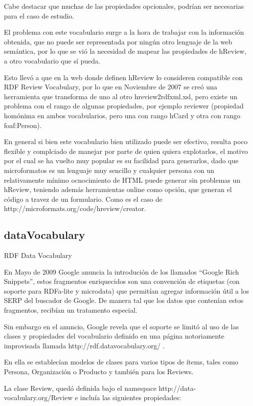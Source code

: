 Cabe destacar que muchas de las propiedades opcionales, podrían ser necesarias para el caso de estudio.

El problema con este vocabulario surge a la hora de trabajar con la información obtenida, que no puede ser representada por ningún otro 
lenguaje de la web semántica, por lo que se vió la necesidad de mapear las propiedades de hReview, a otro vocabulario que sí pueda.

Esto llevó a que en la web donde definen hReview lo consideren compatible con RDF Review Vocabulary, por lo que en Noviembre de 2007 
se creó una herramienta que transforma de uno al otro hreview2rdfxml.xsl,  pero existe un problema con el rango de algunas 
propiedades, por ejemplo reviewer (propiedad homónima en ambos vocabularios, pero una con rango hCard y otra con rango foaf:Person).

En general si bien este vocabulario bien utilizado puede ser efectivo, resulta poco flexible y complciado de manejar por parte 
de quien quiera explotarlos, el motivo por el cual se ha vuelto muy popular es su facilidad para generarlos, dado que 
microformatos es un lenguaje muy sencillo y cualquier persona con un relativamente mínimo ocnocimiento de HTML puede generar 
sin problemas un hReview, teniendo además herramientas online como opción, que generan el código a travez de un formulario. 
Como es el caso de http://microformats.org/code/hreview/creator. 


\subsection{dataVocabulary}
RDF Data Vocabulary

En Mayo de 2009 Google anuncia la introdución de los llamados ``Google Rich Snippets'', estos fragmentos enriquecidos son una convención 
de etiquetas (con soporte para RDFa-lite y microdata) que permitían agregar información útil a los SERP del buscador de Google. De manera tal 
que los datos que contenían estos fragmentos, recibían un tratamento especial.

Sin embargo en el anuncio, Google revela que el soporte se limitó al uso de las clases y propiedades del vocabulario definido en una página 
notoriamente improvisada llamada http://rdf.datavocabulary.org/ . 

En ella se establecían modelos de clases para varios tipos de ítems, tales como Persona, Organización o Producto y también para los Reviews.

La clase Review, quedó definida bajo el namespace http://data-vocabulary.org/Review e incluía las siguientes propiedades:

